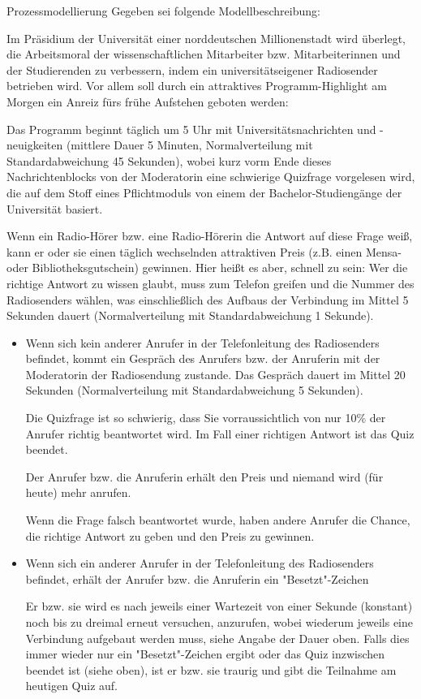 \documentclass{article}
\begin{document}
\begin{exercise}{Prozessmodellierung}
  Gegeben sei folgende Modellbeschreibung:
  \par Im Präsidium der Universität einer norddeutschen Millionenstadt wird überlegt, die Arbeitsmoral der wissenschaftlichen Mitarbeiter bzw. Mitarbeiterinnen und der Studierenden zu verbessern, indem ein universitätseigener Radiosender betrieben wird. Vor allem soll durch ein attraktives Programm-Highlight am Morgen ein Anreiz fürs frühe Aufstehen geboten werden:
  \par Das Programm beginnt täglich um 5 Uhr mit Universitätsnachrichten und -neuigkeiten (mittlere Dauer 5 Minuten, Normalverteilung mit Standardabweichung 45 Sekunden), wobei kurz vorm Ende dieses Nachrichtenblocks von der Moderatorin eine schwierige Quizfrage vorgelesen wird, die auf dem Stoff eines Pflichtmoduls von einem der Bachelor-Studiengänge der Universität basiert.
  \par Wenn ein Radio-Hörer bzw. eine Radio-Hörerin die Antwort auf diese Frage weiß, kann er oder sie einen täglich wechselnden attraktiven Preis (z.B. einen Mensa- oder Bibliotheksgutschein) gewinnen. Hier heißt es aber, schnell zu sein: Wer die richtige Antwort zu wissen glaubt, muss zum Telefon greifen und die Nummer des Radiosenders wählen, was einschließlich des Aufbaus der Verbindung im Mittel 5 Sekunden dauert (Normalverteilung mit Standardabweichung 1 Sekunde).
  \begin{itemize}
    \item Wenn sich kein anderer Anrufer in der Telefonleitung des Radiosenders befindet, kommt ein Gespräch des Anrufers bzw. der Anruferin mit der Moderatorin der Radiosendung zustande. Das Gespräch dauert im Mittel 20 Sekunden (Normalverteilung mit Standardabweichung 5 Sekunden).
          \par Die Quizfrage ist so schwierig, dass Sie vorraussichtlich von nur 10\% der Anrufer richtig beantwortet wird. Im Fall einer richtigen Antwort ist das Quiz beendet.
          \par Der Anrufer bzw. die Anruferin erhält den Preis und niemand wird (für heute) mehr anrufen.
          \par Wenn die Frage falsch beantwortet wurde, haben andere Anrufer die Chance, die richtige Antwort zu geben und den Preis zu gewinnen.
    \item Wenn sich ein anderer Anrufer in der Telefonleitung des Radiosenders befindet, erhält der Anrufer bzw. die Anruferin ein "Besetzt"-Zeichen
          \par Er bzw. sie wird es nach jeweils einer Wartezeit von einer Sekunde (konstant) noch bis zu dreimal erneut versuchen, anzurufen, wobei wiederum jeweils eine Verbindung aufgebaut werden muss, siehe Angabe der Dauer oben. Falls dies immer wieder nur ein "Besetzt"-Zeichen ergibt oder das Quiz inzwischen beendet ist (siehe oben), ist er bzw. sie traurig und gibt die Teilnahme am heutigen Quiz auf.

\end{itemize}
\end{exercise}
\end{document}
